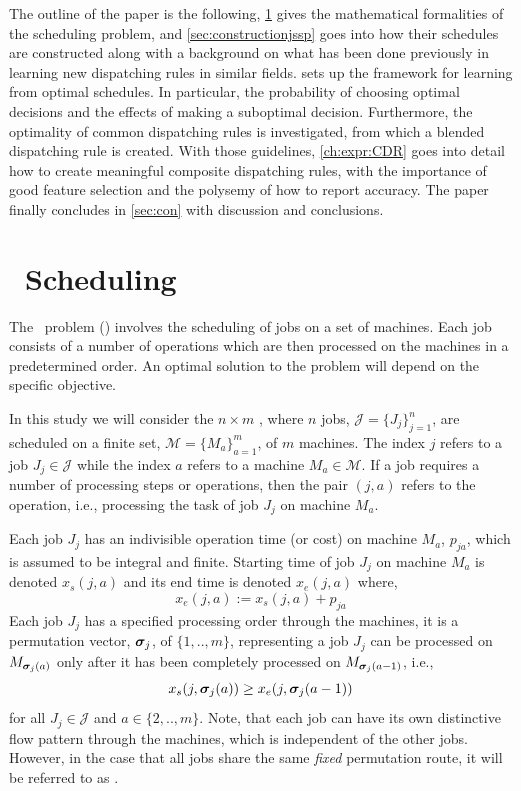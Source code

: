 \documentclass[smallextended]{svjour3}
\begin{document}
The outline of the paper is the following, \cref{sec:problemdef} gives the 
mathematical formalities of the scheduling problem, and  
\cref{sec:constructionjssp} goes into how their schedules are constructed along 
with a background on what has been done previously in learning new dispatching 
rules in similar fields. 
 sets up the framework for learning from optimal schedules. In 
particular, the probability of choosing optimal decisions and the effects of 
making a suboptimal decision. 
Furthermore, the optimality of common dispatching rules is investigated, from 
which a blended dispatching rule is created. 
With those guidelines, \cref{ch:expr:CDR} goes into detail how to create 
meaningful composite dispatching rules, with the importance of good feature 
selection and the polysemy of how to report accuracy. 
The paper finally concludes in \cref{sec:con} with discussion and conclusions.


\section{\Jsp~Scheduling}\label{sec:problemdef}
The \jsp~problem (\JSP) involves the scheduling of jobs on a set of 
machines. Each job consists of a number of operations which are then processed 
on the machines in a predetermined order. An optimal solution to the problem 
will depend on the specific objective. 

In this study we will consider the $n\times m$ \JSP, where $n$ jobs, 
$\mathcal{J}=\{J_j\}_{j=1}^n$, are scheduled on a finite set, 
$\mathcal{M}=\{M_a\}_{a=1}^m$, of $m$ machines. The index $j$ refers to a job 
$J_j\in\mathcal{J}$ while the index  $a$ refers to a machine 
$M_a\in\mathcal{M}$. 
If a job requires a number of processing steps or operations, then the pair 
$(j,a)$ refers to the operation, i.e., processing the task of job $J_j$ on 
machine $M_a$. 

Each job $J_j$ has an indivisible operation time (or cost) on machine $M_a$, 
$p_{ja}$, which is assumed to be integral and finite. 
Starting time of job $J_j$ on machine $M_a$ is denoted $x_s(j,a)$ and its 
end time is denoted $x_e(j,a)$ where, 
\begin{equation}  x_e(j,a):=x_s(j,a)+p_{ja} \end{equation} 
Each job $J_j$ has a specified processing order through the machines, it is a 
permutation vector, $\bm \sigma_j$, of $\{1,..,m\}$, representing a job $J_j$ can 
be processed on $M_{\bm \sigma_j(a)}$ only after it has been completely processed 
on $M_{\bm \sigma_j(a-1)}$, i.e.,
\begin{equation}\label{eq:permutation}
x_s(j,\bm \sigma_j(a)) \geq x_e(j,\bm \sigma_j(a-1)) 
\end{equation}
for all $J_j\in\mathcal{J}$ and $a\in\{2,..,m\}$. 
Note, that each job can have its own distinctive flow pattern through the 
machines, which is independent of the other jobs. However, in the case that all 
jobs share the same \emph{fixed} permutation route, it will be referred to as 
\FSP.
\end{document}
